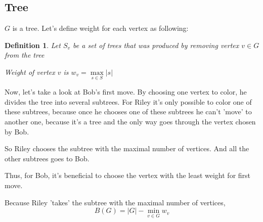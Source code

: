 \documentclass[12pt,a4paper, flushleft]{article}
\newtheorem{Def}{Definition}[section]
\begin{document}
\subsection{Tree} $G$ is a tree. Let's define weight for each vertex as following:
	
	\begin{Def}
		Let $S_v$ be a set of trees that was produced by removing vertex $v\in G$ from the tree
		
		Weight of vertex $v$ is $w_v = \max\limits_{s\in S}|s|$
	\end{Def}
	
	Now, let's take a look at Bob's first move. By choosing one vertex to color, he divides the tree into several subtrees. For Riley it's only possible to color one of these subtrees, because once he chooses one of these subtrees he can't 'move' to another one, because it's a tree and the only way goes through the vertex chosen by Bob. 
	
	So Riley chooses the subtree with the maximal number of vertices. And all the other subtrees goes to Bob.
	
	Thus, for Bob, it's beneficial to choose the vertex with the least weight for first move. 
	
	Because Riley 'takes' the subtree with the maximal number of vertices, $$B(G) = |G| - \min\limits_{v\in G} w_v$$
	
\end{document}
